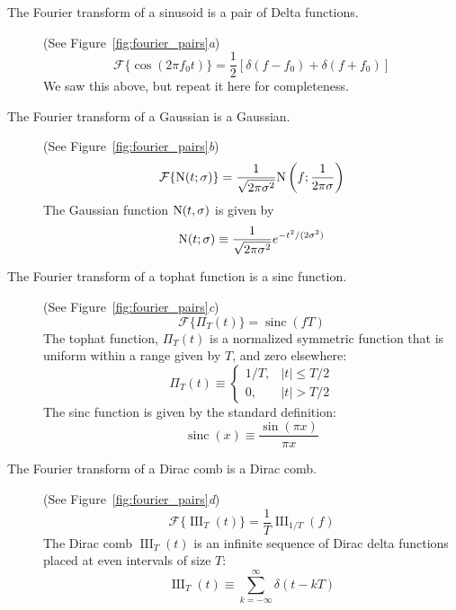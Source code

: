 \documentclass[preprint]{aastex}
\DeclareMathOperator{\sinc}{sinc}
\DeclareMathOperator{\III}{III}
\newcommand{\Fig}[1]{Figure~\ref{fig:#1}}
\newcommand{\fig}[1]{\Fig{#1}}
\begin{document}
\begin{description}
  \item[The Fourier transform of a sinusoid is a pair of Delta functions.]
    (See \fig{fourier_pairs}{\it a})
    \begin{equation}
      \mathcal{F}\{\cos(2\pi f_0 t)\} = \frac{1}{2}\left[\delta(f-f_0) + \delta(f+f_0)\right]
    \end{equation}
    We saw this above, but repeat it here for completeness.

   \item[The Fourier transform of a Gaussian is a Gaussian.]
    (See \fig{fourier_pairs}{\it b})
     \begin{equation}
       \mathcal{F}\{{\rm N}(t; \sigma)\} = \frac{1}{\sqrt{2\pi\sigma^2}}{\rm N}\left(f;\frac{1}{2\pi\sigma}\right)
     \end{equation}
     The Gaussian function ${\rm N}(t, \sigma)$ is given by
     \begin{equation}
       {\rm N}(t; \sigma) \equiv \frac{1}{\sqrt{2\pi\sigma^2}}e^{-t^2/(2\sigma^2)}
     \end{equation}

  \item[The Fourier transform of a tophat function is a sinc function.]
    (See \fig{fourier_pairs}{\it c})
    \begin{equation}
      \mathcal{F}\{\Pi_T(t)\} = \sinc(f T)
    \end{equation}
    The tophat function, $\Pi_T(t)$ is a normalized symmetric function that
    is uniform within a range given by $T$, and zero elsewhere:
    \begin{equation}
      \Pi_T(t)  \equiv \left\{
      \begin{array}{ll}
        1 / T, & |t| \le T / 2 \\
        0,     & |t| > T / 2
      \end{array}
      \right.
    \end{equation}
    The sinc function is given by the standard definition:
    \begin{equation}
      \sinc(x) \equiv \frac{\sin(\pi x)}{\pi x}
    \end{equation}

  \item[The Fourier transform of a Dirac comb is a Dirac comb.]
    (See \fig{fourier_pairs}{\it d})
    \begin{equation}
      \mathcal{F}\{\III_T(t)\} = \frac{1}{T}\III_{1/T}(f)
    \end{equation}
    The Dirac comb $\III_T(t)$ is an infinite sequence of Dirac delta functions
    placed at even intervals of size $T$:
    \begin{equation}
      \III_T(t) \equiv \sum_{k=-\infty}^\infty \delta(t - kT)
    \end{equation}
\end{description}
\end{document}

